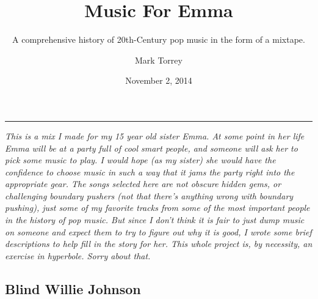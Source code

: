 \documentclass[letterpaper,]{article}
\title{Music For Emma}
\subtitle{A comprehensive history of 20th-Century pop music in the form of a
mixtape.}
\author{Mark Torrey}
\date{November 2, 2014}
\begin{document}
\maketitle

\begin{center}\rule{0.5\linewidth}{\linethickness}\end{center}

\emph{This is a mix I made for my 15 year old sister Emma. At some point
in her life Emma will be at a party full of cool smart people, and
someone will ask her to pick some music to play. I would hope (as my
sister) she would have the confidence to choose music in such a way that
it jams the party right into the appropriate gear. The songs selected
here are not obscure hidden gems, or challenging boundary pushers (not
that there's anything wrong with boundary pushing), just some of my
favorite tracks from some of the most important people in the history of
pop music. But since I don't think it is fair to just dump music on
someone and expect them to try to figure out why it is good, I wrote
some brief descriptions to help fill in the story for her. This whole
project is, by necessity, an exercise in hyperbole. Sorry about that.}

\hypertarget{blind-willie-johnson}{%
\subsection{Blind Willie Johnson}\label{blind-willie-johnson}}
\end{document}

